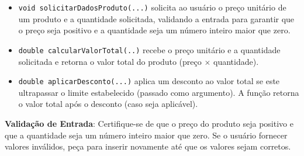 \documentclass[12pt]{article}
\begin{document}
\begin{enumerate}
\begin{itemize}
              \item \texttt{void solicitarDadosProduto(...)} solicita ao usuário o preço unitário de um produto e a quantidade solicitada, validando a entrada para garantir que o preço seja positivo e a quantidade seja um número inteiro maior que zero.

              \item \texttt{double calcularValorTotal(..)} recebe o preço unitário e a quantidade solicitada e retorna o valor total do produto (preço $\times$ quantidade).

              \item \texttt{double aplicarDesconto(...)} aplica um desconto ao valor total se este ultrapassar o limite estabelecido (passado como argumento). A função retorna o valor total após o desconto (caso seja aplicável).

          \end{itemize}

          \textbf{Validação de Entrada}: Certifique-se de que o preço do produto seja positivo e que a quantidade seja um número inteiro maior que zero. Se o usuário fornecer valores inválidos, peça para inserir novamente até que os valores sejam corretos.
\end{enumerate}
\end{document}
